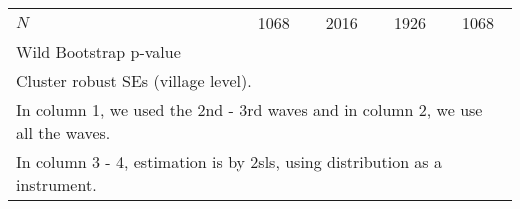 {\begin{tabular}{l*{4}{c}}
\hline
\(N\)       &        1068         &        2016         &        1926         &        1068         \\
Wild Bootstrap p-value &                     &                     &                     &                     \\
\hline\hline
\multicolumn{5}{l}{\footnotesize Cluster robust SEs (village level). }\\
\multicolumn{5}{l}{\footnotesize In column 1, we used the 2nd - 3rd waves and in column 2, we use all the waves.}\\
\multicolumn{5}{l}{\footnotesize In column 3 - 4, estimation is by 2sls, using distribution as a instrument.}\\
\end{tabular}
}
